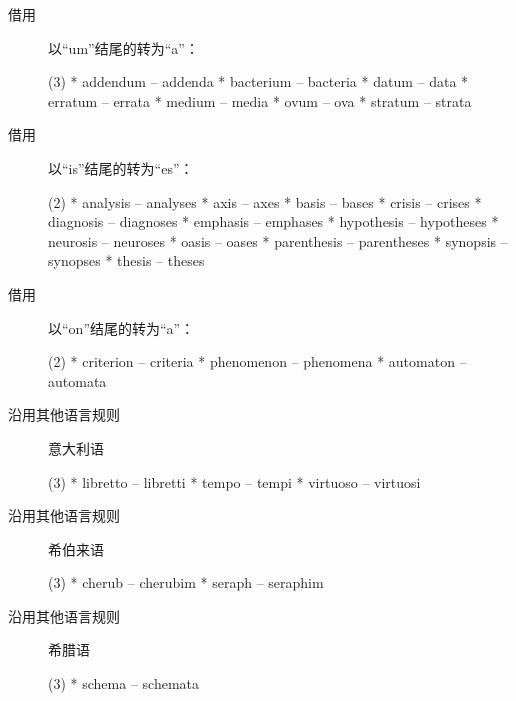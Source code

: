 \begin{description}
\item[借用] 以``um''结尾的转为``a''：
  \begin{taskitem}(3)
    *  addendum -- addenda
    *  bacterium -- bacteria
    *  datum -- data
    *  erratum -- errata
    *  medium -- media
    *  ovum -- ova
    *  stratum -- strata
  \end{taskitem}


\item[借用] 以``is''结尾的转为``es''：
  \begin{taskitem}(2)
    *  analysis -- analyses
    *  axis -- axes
    *  basis -- bases
    *  crisis -- crises
    *  diagnosis -- diagnoses
    *  emphasis -- emphases
    *  hypothesis -- hypotheses
    *  neurosis -- neuroses
    *  oasis -- oases
    *  parenthesis -- parentheses
    *  synopsis -- synopses
    *  thesis -- theses
  \end{taskitem}


\item[借用] 以``on''结尾的转为``a''：
  \begin{taskitem}(2)
    *  criterion -- criteria
    *  phenomenon -- phenomena
    *  automaton -- automata
  \end{taskitem}


\item[沿用其他语言规则] 意大利语
  \begin{taskitem}(3)
    *  libretto -- libretti
    *  tempo -- tempi
    *  virtuoso -- virtuosi
  \end{taskitem}

\item[沿用其他语言规则] 希伯来语
  \begin{taskitem}(3)
    *  cherub -- cherubim
    *  seraph -- seraphim
  \end{taskitem}

\item[沿用其他语言规则] 希腊语
  \begin{taskitem}(3)
    *  schema -- schemata
  \end{taskitem}
\end{description}


